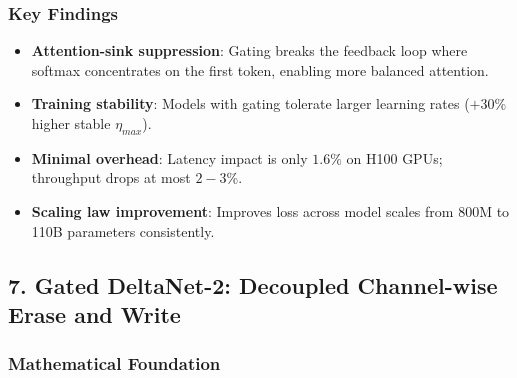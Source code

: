 \subsubsection{Key Findings}

\begin{itemize}[leftmargin=*]
    \item \textbf{Attention-sink suppression}: Gating breaks the feedback loop where softmax concentrates on the first token, enabling more balanced attention.
    \item \textbf{Training stability}: Models with gating tolerate larger learning rates ($+30\%$ higher stable $\eta_{max}$).
    \item \textbf{Minimal overhead}: Latency impact is only $1.6\%$ on H100 GPUs; throughput drops at most $2-3\%$.
    \item \textbf{Scaling law improvement}: Improves loss across model scales from 800M to 110B parameters consistently.
\end{itemize}

\normalsize

\subsection{7. Gated DeltaNet-2: Decoupled Channel-wise Erase and Write}

\subsubsection{Mathematical Foundation}

